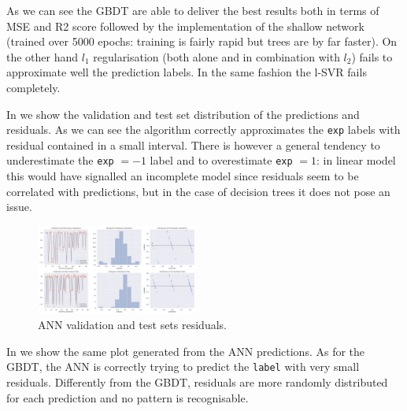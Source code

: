 As we can see the GBDT are able to deliver the best results both in
terms of MSE and R2 score followed by the implementation of the shallow
network (trained over 5000 epochs: training is fairly rapid but trees are by
far faster).
On the other hand $l_1$ regularisation (both alone and in combination with
$l_2$) fails to approximate well the prediction labels. In the same fashion the
l-SVR fails completely.

In  we show the validation and test set distribution of the
predictions and residuals.
As we can see the algorithm correctly approximates the \texttt{exp} labels with
residual contained in a small interval.
There is however a general tendency to underestimate the \texttt{exp} $= -1$
label and to overestimate \texttt{exp} $= 1$: in linear model this would have
signalled an incomplete model since residuals seem to be correlated with
predictions, but in the case of decision trees it does not pose an issue.

\begin{figure}[htbp]
  \centering
  \includegraphics[width=0.475\textwidth]{img/ann_mod}
  \caption{ANN validation and test sets residuals.}
  \label{fig:ml:ann}
\end{figure}

In  we show the same plot generated from the ANN predictions.
As for the GBDT, the ANN is correctly trying to predict the \texttt{label} with
very small residuals.
Differently from the GBDT, residuals are more randomly distributed for each
prediction and no pattern is recognisable.

